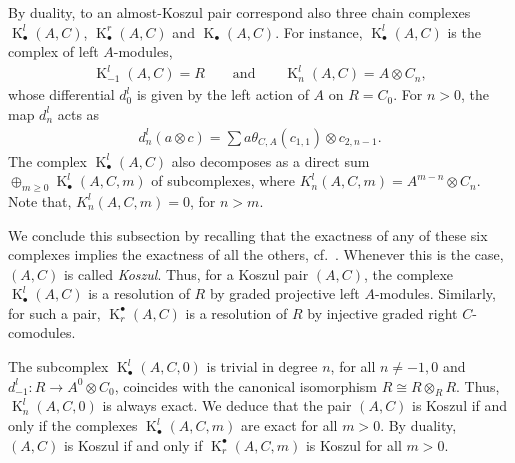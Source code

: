 \documentclass[11pt]{article}
\DeclareMathOperator{\K}{K}
\newcommand\ot{\otimes}
\renewcommand{\^}[1]{\mbox{$^{\left( #1 \right)}$}}
\renewcommand{\_}[1]{\mbox{$_{\left( #1 \right)}$}}
\numberwithin{equation}{section}
\begin{document}
By duality, to an almost-Koszul pair correspond also three chain complexes $\operatorname{K}^l_\bullet\!(A{,}C)$, $\operatorname{K}^r_\bullet\!(A{,}C)$ and $\operatorname{K}_\bullet(A,C)$. For instance, $\operatorname{K}^l_\bullet(A,C)$ is the complex of left $A$-modules,
\begin{gather*} \operatorname{K}_{-1}^l(A,C)=R \qquad \text{and} \qquad \operatorname{K}^l_n(A,C)=A \ot C_n,\end{gather*}
whose dif\/ferential $d_{0}^l$ is given by the left action of $A$ on $R=C_0$. For $n > 0$, the map $d_n^l$ acts as
\begin{gather*}
	d_{n}^{l}(a\otimes c)=\sum\limits a\theta _{C,A}(c_{1,{1}})\otimes c_{2,{n-1}}.
\end{gather*}
The complex $\operatorname{K}_\bullet^l(A,C)$ also decomposes as a direct sum $\oplus_{m\geq 0}\operatorname{K}^l_\bullet(A,C,m)$ of subcomplexes, where ${K}^l_n(A,C,m)=A^{m-n}\ot C_n$. Note that, ${K}^l_n(A,C,m)=0$, for $n>m$.

We conclude this subsection by recalling that the exactness of any of these six complexes implies the exactness of all the others, cf.\ \cite[Theorem~2.3]{jps}. Whenever this is the case, $(A,C)$ is called \emph{Koszul}. Thus, for a Koszul pair $(A,C)$, the complexe $\operatorname{K}_\bullet^l(A,C)$ is a resolution of $R$ by graded projective left $A$-modules. Similarly, for such a pair, $\operatorname{K}^\bullet_r(A,C)$ is a resolution of $R$ by injective graded right $C$-comodules.

The subcomplex $\K_\bullet^l(A,C,0)$ is trivial in degree $n$, for all $n\neq -1,0$ and $d_{-1}^l\colon R\to A^0\ot C_0$, coincides with the canonical isomorphism $R\cong R\ot_R R$. Thus, $\K_n^l(A,C,0)$ is always exact. We deduce that the pair $(A,C)$ is Koszul if and only if the complexes $\K_\bullet^l(A,C,m)$ are exact for all $m>0$. By duality, $(A,C)$ is Koszul if and only if $\K^\bullet_r(A,C,m)$ is Koszul for all $m>0$.
\end{document}
